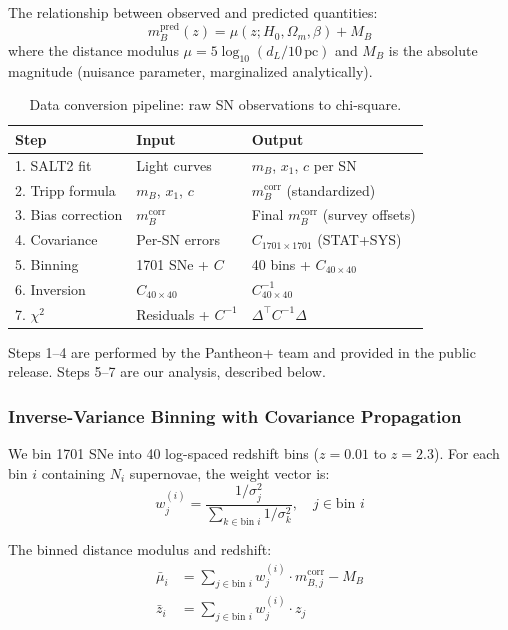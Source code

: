 \documentclass[twocolumn,showpacs,preprintnumbers,amsmath,amssymb,prl]{revtex4-2}
\begin{document}
The relationship between observed and predicted quantities:
\begin{equation}
m_B^\text{pred}(z) = \mu(z; H_0, \Omega_m, \beta) + M_B
\end{equation}
where the distance modulus $\mu = 5\log_{10}(d_L/10\,\text{pc})$ and $M_B$ is the absolute magnitude (nuisance parameter, marginalized analytically).

\begin{table}[h]
\caption{Data conversion pipeline: raw SN observations to chi-square.}
\label{tab:conversion}
\begin{ruledtabular}
\begin{tabular}{lll}
Step & Input & Output \\
\hline
1. SALT2 fit & Light curves & $m_B$, $x_1$, $c$ per SN \\
2. Tripp formula & $m_B$, $x_1$, $c$ & $m_B^\text{corr}$ (standardized) \\
3. Bias correction & $m_B^\text{corr}$ & Final $m_B^\text{corr}$ (survey offsets) \\
4. Covariance & Per-SN errors & $C_{1701\times1701}$ (STAT+SYS) \\
5. Binning & 1701 SNe + $C$ & 40 bins + $C_{40\times40}$ \\
6. Inversion & $C_{40\times40}$ & $C^{-1}_{40\times40}$ \\
7. $\chi^2$ & Residuals + $C^{-1}$ & $\Delta^\top C^{-1} \Delta$ \\
\end{tabular}
\end{ruledtabular}
\end{table}

Steps 1--4 are performed by the Pantheon+ team and provided in the public release. Steps 5--7 are our analysis, described below.

\subsubsection{Inverse-Variance Binning with Covariance Propagation}

We bin 1701 SNe into 40 log-spaced redshift bins ($z = 0.01$ to $z = 2.3$). For each bin $i$ containing $N_i$ supernovae, the weight vector is:
\begin{equation}
w_j^{(i)} = \frac{1/\sigma_j^2}{\sum_{k \in \text{bin } i} 1/\sigma_k^2}, \quad j \in \text{bin } i
\end{equation}

The binned distance modulus and redshift:
\begin{align}
\bar{\mu}_i &= \sum_{j \in \text{bin } i} w_j^{(i)} \cdot m_{B,j}^\text{corr} - M_B \\
\bar{z}_i &= \sum_{j \in \text{bin } i} w_j^{(i)} \cdot z_j
\end{align}
\end{document}
